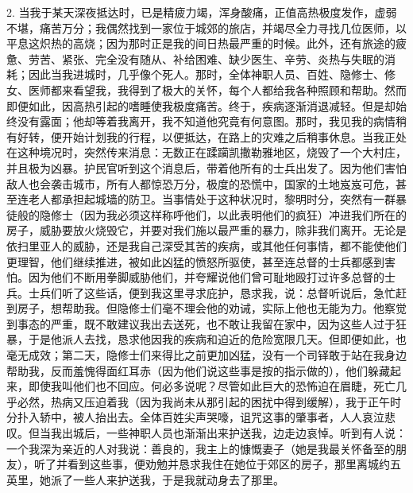 2. 当我于某天深夜抵达时，已是精疲力竭，浑身酸痛，正值高热极度发作，虚弱不堪，痛苦万分；我偶然找到一家位于城郊的旅店，并竭尽全力寻找几位医师，以平息这炽热的高烧；因为那时正是我的间日热最严重的时候。此外，还有旅途的疲惫、劳苦、紧张、完全没有随从、补给困难、缺少医生、辛劳、炎热与失眠的消耗；因此当我进城时，几乎像个死人。那时，全体神职人员、百姓、隐修士、修女、医师都来看望我，我得到了极大的关怀，每个人都给我各种照顾和帮助。然而即便如此，因高热引起的嗜睡使我极度痛苦。终于，疾病逐渐消退减轻。但是却始终没有露面；他却等着我离开，我不知道他究竟有何意图。那时，我见我的病情稍有好转，便开始计划我的行程，以便抵达，在路上的灾难之后稍事休息。当我正处在这种境况时，突然传来消息：无数正在蹂躏凯撒勒雅地区，烧毁了一个大村庄，并且极为凶暴。护民官听到这个消息后，带着他所有的士兵出发了。因为他们害怕敌人也会袭击城市，所有人都惊恐万分，极度的恐慌中，国家的土地岌岌可危，甚至连老人都承担起城墙的防卫。当事情处于这种状况时，黎明时分，突然有一群暴徒般的隐修士（因为我必须这样称呼他们，以此表明他们的疯狂）冲进我们所在的房子，威胁要放火烧毁它，并要对我们施以最严重的暴力，除非我们离开。无论是依扫里亚人的威胁，还是我自己深受其苦的疾病，或其他任何事情，都不能使他们更理智，他们继续推进，被如此凶猛的愤怒所驱使，甚至连总督的士兵都感到害怕。因为他们不断用拳脚威胁他们，并夸耀说他们曾可耻地殴打过许多总督的士兵。士兵们听了这些话，便到我这里寻求庇护，恳求我，说：总督听说后，急忙赶到房子，想帮助我。但隐修士们毫不理会他的劝诫，实际上他也无能为力。他察觉到事态的严重，既不敢建议我出去送死，也不敢让我留在家中，因为这些人过于狂暴，于是他派人去找，恳求他因我的疾病和迫近的危险宽限几天。但即便如此，也毫无成效；第二天，隐修士们来得比之前更加凶猛，没有一个司铎敢于站在我身边帮助我，反而羞愧得面红耳赤（因为他们说这些事是按的指示做的），他们躲藏起来，即使我叫他们也不回应。何必多说呢？尽管如此巨大的恐怖迫在眉睫，死亡几乎必然，热病又压迫着我（因为我尚未从那引起的困扰中得到缓解），我于正午时分扑入轿中，被人抬出去。全体百姓尖声哭嚎，诅咒这事的肇事者，人人哀泣悲叹。但当我出城后，一些神职人员也渐渐出来护送我，边走边哀悼。听到有人说：一个我深为亲近的人对我说：善良的，我主上的慷慨妻子（她是我最关怀备至的朋友），听了并看到这些事，便劝勉并恳求我住在她位于郊区的房子，那里离城约五英里，她派了一些人来护送我，于是我就动身去了那里。\par

